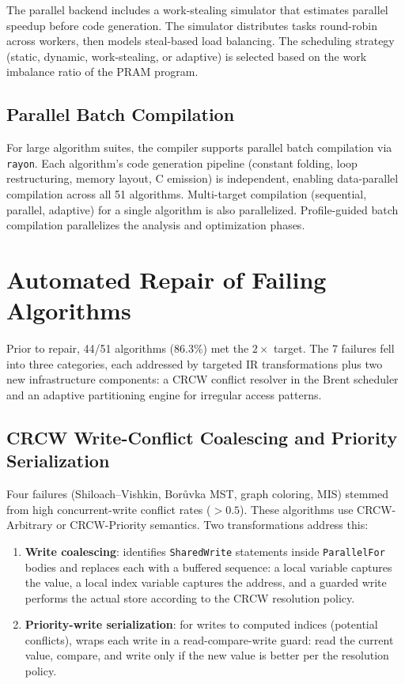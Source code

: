 \documentclass[11pt]{article}
\begin{document}
The parallel backend includes a work-stealing simulator that estimates
parallel speedup before code generation.  The simulator distributes
tasks round-robin across workers, then models steal-based load balancing.
The scheduling strategy (static, dynamic, work-stealing, or adaptive)
is selected based on the work imbalance ratio of the PRAM program.

\subsection{Parallel Batch Compilation}

For large algorithm suites, the compiler supports parallel batch
compilation via \texttt{rayon}.  Each algorithm's code generation pipeline
(constant folding, loop restructuring, memory layout, C emission) is
independent, enabling data-parallel compilation across all 51 algorithms.
Multi-target compilation (sequential, parallel, adaptive) for a single
algorithm is also parallelized.  Profile-guided batch compilation
parallelizes the analysis and optimization phases.

\section{Automated Repair of Failing Algorithms}
\label{sec:repair}

Prior to repair, 44/51 algorithms (86.3\%) met the $2\times$ target.
The 7 failures fell into three categories, each addressed by targeted
IR transformations plus two new infrastructure components: a CRCW
conflict resolver in the Brent scheduler and an adaptive partitioning
engine for irregular access patterns.

\subsection{CRCW Write-Conflict Coalescing and Priority Serialization}

Four failures (Shiloach--Vishkin, Bor\r{u}vka MST, graph coloring, MIS)
stemmed from high concurrent-write conflict rates ($> 0.5$).  These
algorithms use CRCW-Arbitrary or CRCW-Priority semantics.  Two
transformations address this:
\begin{enumerate}
\item \textbf{Write coalescing}: identifies \texttt{SharedWrite} statements inside
\texttt{ParallelFor} bodies and replaces each with a buffered sequence:
a local variable captures the value, a local index variable captures the
address, and a guarded write performs the actual store according to the
CRCW resolution policy.
\item \textbf{Priority-write serialization}: for writes to computed indices
(potential conflicts), wraps each write in a read-compare-write guard:
read the current value, compare, and write only if the new value is
better per the resolution policy.
\end{enumerate}
\end{document}
